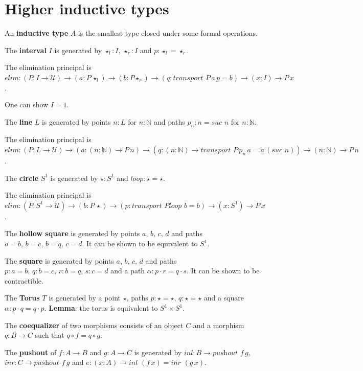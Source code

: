 \documentclass[a4paper]{article}
\begin{document}
\section*{Higher inductive types}

An \textbf{inductive type} $A$ is the smallest type closed under some formal operations.

The \textbf{interval} $I$ is generated by $\star_l : I$, $\star_r : I$ and $p : \star_l = \star_r$.

The elimination principal is $\textit{elim} : (P : I \to \mathcal{U}) \to (a : P \, \star_l) \to (b : P \star_r) \to (q : \textit{transport } P \, a \, p = b) \to (x : I) \to P \, x$.

One can show $I = 1$.

The \textbf{line} $L$ is generated by points $n : L$ for $n : \mathbb{N}$ and paths $p_n : n = \textit{suc } n$ for $n : \mathbb{N}$.

The elimination principal is $\textit{elim} : (P : L \to \mathcal{U}) \to (a : (n : \mathbb{N}) \to P \, n) \to (q : (n : \mathbb{N}) \to \textit{transport } P \, p_n \, a = a \, (\textit{suc } n)) \to (n : \mathbb{N}) \to P \, n$.

The \textbf{circle} $S^1$ is generated by $\star : S^1$ and $\textit{loop} : \star = \star$.

The elimination principal is $\textit{elim} : (P : S^1 \to \mathcal{U}) \to (b : P \, \star) \to (p : \textit{transport } P \textit{loop } b = b) \to (x : S^1) \to P \, x$.

The \textbf{hollow square} is generated by points $a, \, b, \, c, \, d$ and paths $a = b, \, b = c, \, b = q, \, c = d$. It can be shown to be equivalent to $S^1$.

The \textbf{square} is generated by points $a, \, b, \, c, \, d$ and paths $p : a = b, \, q : b = c, \, r : b = q, \, s : c = d$ and a path $\alpha : p \cdot r = q \cdot s$. It can be shown to be contractible.

The \textbf{Torus} $T$ is generated by a point $\star$, paths $p : \star = \star, \, q : \star = \star$ and a square $\alpha : p \cdot q = q \cdot p$. \textbf{Lemma}: the torus is equivalent to $S^1 \times S^1$.

The \textbf{coequalizer} of two morphisms consists of an object $C$ and a morphism $q : B \to C$ such that $q \circ f = q \circ g$.

The \textbf{pushout} of $f : A \to B$ and $g : A \to C$ is generated by $\textit{inl} : B \to \textit{pushout } f \, g$, $\textit{inr} : C \to \textit{pushout } f \, g$ and $e : (x : A) \to \textit{inl } (f \, x) = \textit{inr } (g \, x)$.
\end{document}
